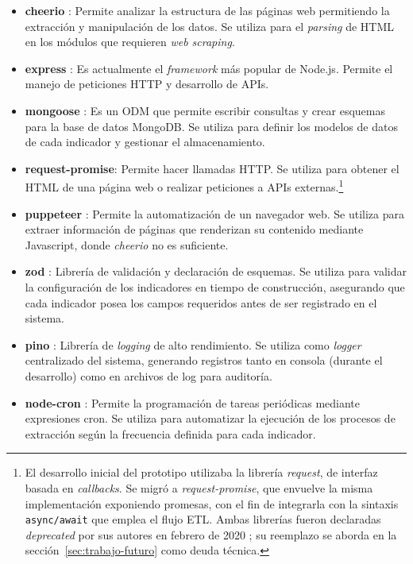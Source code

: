 \documentclass[12pt,letterpaper,oneside]{report}
\begin{document}
\begin{itemize}
  \item \textbf{cheerio} \parencite{cheerio}: Permite analizar la estructura de las p\'aginas web permitiendo la extracci\'on y manipulaci\'on de los datos. Se utiliza para el \textit{parsing} de HTML en los m\'odulos que requieren \textit{web scraping}.
  \item \textbf{express} \parencite{express}: Es actualmente el \textit{framework} m\'as popular de Node.js. Permite el manejo de peticiones HTTP y desarrollo de APIs.
  \item \textbf{mongoose} \parencite{mongoose}: Es un ODM que permite escribir consultas y crear esquemas para la base de datos MongoDB. Se utiliza para definir los modelos de datos de cada indicador y gestionar el almacenamiento.
  \item \textbf{request-promise}: Permite hacer llamadas HTTP. Se utiliza para obtener el HTML de una p\'agina web o realizar peticiones a APIs externas.\footnote{El desarrollo inicial del prototipo utilizaba la librer\'ia \textit{request}, de interfaz basada en \textit{callbacks}. Se migr\'o a \textit{request-promise}, que envuelve la misma implementaci\'on exponiendo promesas, con el fin de integrarla con la sintaxis \texttt{async/await} que emplea el flujo ETL. Ambas librer\'ias fueron declaradas \textit{deprecated} por sus autores en febrero de 2020 \parencite{requestpromise}; su reemplazo se aborda en la secci\'on~\ref{sec:trabajo-futuro} como deuda t\'ecnica.}
  \item \textbf{puppeteer} \parencite{puppeteer}: Permite la automatizaci\'on de un navegador web. Se utiliza para extraer informaci\'on de p\'aginas que renderizan su contenido mediante Javascript, donde \textit{cheerio} no es suficiente.
  \item \textbf{zod} \parencite{zod}: Librer\'ia de validaci\'on y declaraci\'on de esquemas. Se utiliza para validar la configuraci\'on de los indicadores en tiempo de construcci\'on, asegurando que cada indicador posea los campos requeridos antes de ser registrado en el sistema.
  \item \textbf{pino} \parencite{pino}: Librer\'ia de \textit{logging} de alto rendimiento. Se utiliza como \textit{logger} centralizado del sistema, generando registros tanto en consola (durante el desarrollo) como en archivos de log para auditor\'ia.
  \item \textbf{node-cron} \parencite{nodecron}: Permite la programaci\'on de tareas peri\'odicas mediante expresiones cron. Se utiliza para automatizar la ejecuci\'on de los procesos de extracci\'on seg\'un la frecuencia definida para cada indicador.
\end{itemize}
\end{document}
